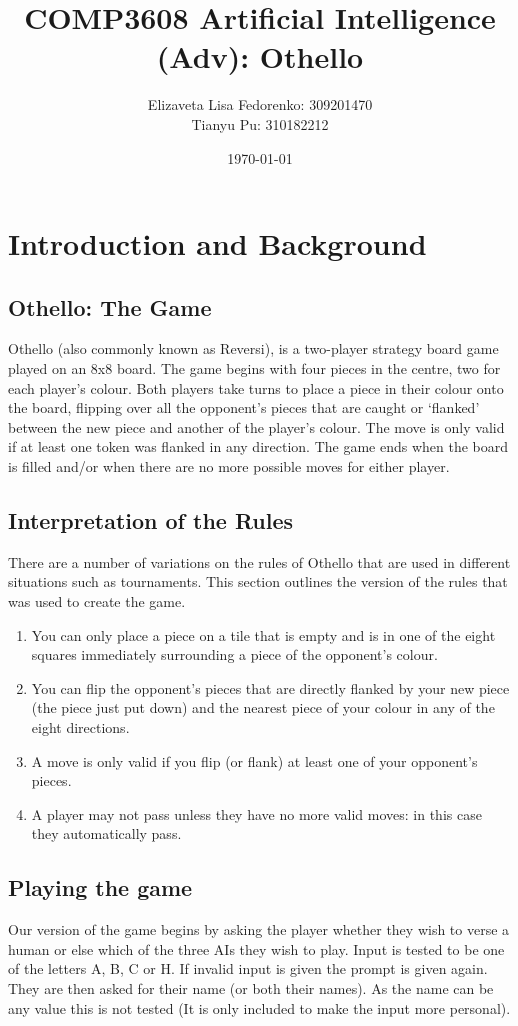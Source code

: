 \documentclass[12pt]{article}
\title{COMP3608 Artificial Intelligence (Adv): Othello}
\author{Elizaveta Lisa Fedorenko: 309201470
\\ Tianyu Pu: 310182212}
\date{\today}
\begin{document}
\maketitle

\begin{abstract}
\end{abstract}

\section{Introduction and Background}
\subsection{Othello: The Game}
Othello (also commonly known as Reversi), is a two-player strategy board game played on an 8x8 board.
The game begins with four pieces in the centre, two for each player's colour. Both players take turns
to place a piece in their colour onto the board, flipping over all the opponent's pieces that are caught
or `flanked' between the new piece and another of the player's colour. The move is only valid if at
least one token was flanked in any direction. The game ends when the board is filled and/or when there are
no more possible moves for either player.

\subsection{Interpretation of the Rules}
There are a number of variations on the rules of Othello that are used in different situations such as
tournaments. This section outlines the version of the rules that was used to create the game.
\begin{enumerate}
 \item You can only place a piece on a tile that is empty and is in one of the eight squares immediately
 surrounding a piece of the opponent's colour.
 \item You can flip the opponent's pieces that are directly flanked by your new piece (the piece just
 put down) and the nearest piece of your colour in any of the eight directions.
 \item A move is only valid if you flip (or flank) at least one of your opponent's pieces.
 \item A player may not pass unless they have no more valid moves: in this case they automatically pass.
\end{enumerate}

\subsection{Playing the game}
Our version of the game begins by asking the player whether they wish to verse a human or else which of the three AIs they wish to play. Input is tested to be one of the letters A, B, C or H. If invalid input is given the prompt is given again. They are then asked for their name (or both their names). As the name can be any value this is not tested (It is only included to make the input more personal).
\end{document}
